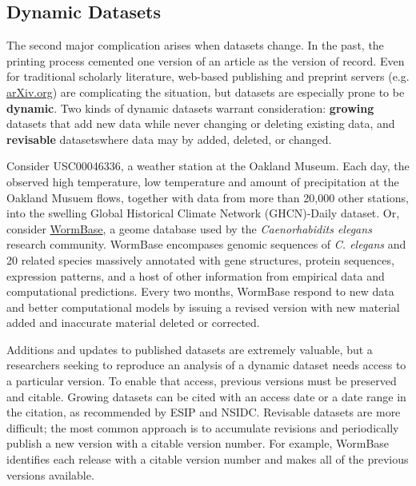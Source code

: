 \documentclass[10pt,twocolumn]{article}
\begin{document}
\subsection*{Dynamic Datasets}\label{dynamic-data}

The second major complication arises when datasets change.
In the past, the printing process cemented one version of an article as the version of record.
Even for traditional scholarly literature, web-based publishing and preprint servers (e.g. \href{http://arxiv.org/}{arXiv.org}) are complicating the situation, but datasets are especially prone to be \textbf{dynamic}.
Two kinds of dynamic datasets warrant consideration: \textbf{growing} datasets that add new data while never changing or deleting existing data, and \textbf{revisable} datasetswhere data may by added, deleted, or changed.

Consider USC00046336, a weather station at the Oakland Museum.
Each day, the observed high temperature, low temperature and amount of precipitation at the Oakland Musuem \cite{global_historical_climate_data_network_daily_????} flows, together with data from more than 20,000 other stations, into the swelling Global Historical Climate Network (GHCN)-Daily\cite{menne_overview_2012} dataset.
Or, consider \href{http://www.wormbase.org/}{WormBase}\cite{harris_wormbase_2014}, a geome database used by the \textit{Caenorhabidits elegans} research community.
WormBase encompases genomic sequences of \emph{C. elegans} and 20 related species massively annotated with gene structures, protein sequences, expression patterns, and a host of other information from empirical data and computational predictions.
Every two months, WormBase respond to new data and better computational models by issuing a revised version with new material added and inaccurate material deleted or corrected.

Additions and updates to published datasets are extremely valuable, but a researchers seeking to reproduce an analysis of a dynamic dataset needs access to a particular version.
To enable that access, previous versions must be preserved and citable.
Growing datasets can be cited with an access date or a date range in the citation, as recommended by ESIP and NSIDC.
Revisable datasets are more difficult; the most common approach is to accumulate revisions and periodically publish a new version with a citable version number.
For example, WormBase identifies each release with a citable version number and makes all of the previous versions available.
\end{document}
